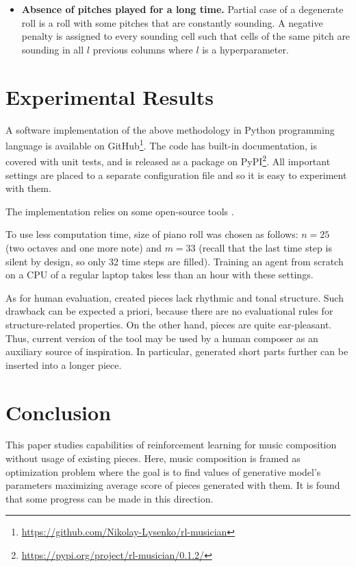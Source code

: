 \documentclass{article}
\begin{document}
\begin{itemize}
    \item \textbf{Absence of pitches played for a long time.} Partial case of a degenerate roll is a roll with some pitches that are constantly sounding. A negative penalty is assigned to every sounding cell such that cells of the same pitch are sounding in all $l$ previous columns where $l$ is a hyperparameter.
\end{itemize}


\section{Experimental Results}
\label{sec:results}

A software implementation of the above methodology in Python programming language is available on GitHub\footnote{\url{https://github.com/Nikolay-Lysenko/rl-musician}}. The code has built-in documentation, is covered with unit tests, and is released as a package on PyPI\footnote{\url{https://pypi.org/project/rl-musician/0.1.2/}}. All important settings are placed to a separate configuration file and so it is easy to experiment with them.

The implementation relies on some open-source tools \cite{brockman2016openai,chollet2015keras,oliphant2006guide,raffel2014intuitive,dong2018pypianoroll}.

To use less computation time, size of piano roll was chosen as follows: $n = 25$ (two octaves and one more note) and $m = 33$ (recall that the last time step is silent by design, so only 32 time steps are filled). Training an agent from scratch on a CPU of a regular laptop takes less than an hour with these settings.

As for human evaluation, created pieces lack rhythmic and tonal structure. Such drawback can be expected a priori, because there are no evaluational rules for structure-related properties. On the other hand, pieces are quite ear-pleasant. Thus, current version of the tool may be used by a human composer as an auxiliary source of inspiration. In particular, generated short parts further can be inserted into a longer piece.


\section{Conclusion}
\label{sec:conclusion}

This paper studies capabilities of reinforcement learning for music composition without usage of existing pieces. Here, music composition is framed as optimization problem where the goal is to find values of generative model's parameters maximizing average score of pieces generated with them. It is found that some progress can be made in this direction.
\end{document}
